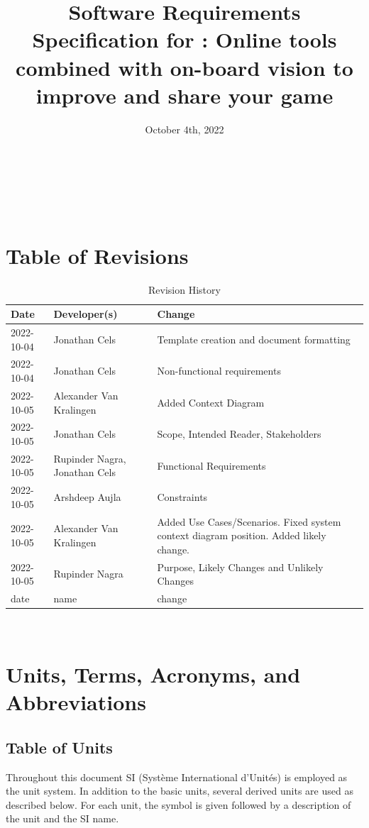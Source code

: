 \documentclass[12pt]{article}
\begin{document}
\title{Software Requirements Specification for \progname{}: Online tools combined with on-board vision to improve and share your game} 
\author{\authname}
\date{October 4th, 2022}
	
\maketitle

~\newpage

\tableofcontents

~\newpage

\section*{Table of Revisions}
\begin{table}[hp]
\caption{Revision History} \label{TblRevisionHistory}
\begin{tabularx}{\textwidth}{llX}
\toprule
\textbf{Date} & \textbf{Developer(s)} & \textbf{Change}\\
\midrule
2022-10-04 & Jonathan Cels & Template creation and document formatting\\ 
2022-10-04 & Jonathan Cels & Non-functional requirements\\
2022-10-05 & Alexander Van Kralingen & Added Context Diagram\\
2022-10-05 & Jonathan Cels & Scope, Intended Reader, Stakeholders\\
2022-10-05 & Rupinder Nagra, Jonathan Cels & Functional Requirements\\
2022-10-05 & Arshdeep Aujla & Constraints\\
2022-10-05 & Alexander Van Kralingen & Added Use Cases/Scenarios. Fixed system context diagram position. Added likely change.\\
2022-10-05 & Rupinder Nagra & Purpose, Likely Changes and Unlikely Changes\\
date & name & change\\
\bottomrule
\end{tabularx}
\end{table}

~\newpage

\section{Units, Terms, Acronyms, and Abbreviations}

\subsection{Table of Units}
Throughout this document SI (Syst\`{e}me International d'Unit\'{e}s) is employed
as the unit system.  In addition to the basic units, several derived units are
used as described below.  For each unit, the symbol is given followed by a
description of the unit and the SI name.
\end{document}
